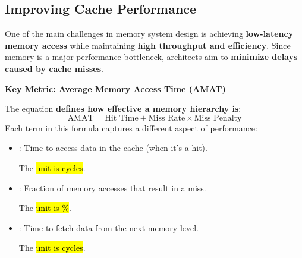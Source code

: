 \subsection{Improving Cache Performance}

One of the main challenges in memory system design is achieving \textbf{low-latency memory access} while maintaining \textbf{high throughput and efficiency}. Since memory is a major performance bottleneck, architects aim to \textbf{minimize delays caused by cache misses}.

\highspace
\begin{flushleft}
    \textcolor{Green3}{ \textbf{Key Metric: Average Memory Access Time (AMAT)}}
\end{flushleft}
The  equation \textbf{defines how effective a memory hierarchy is}:
\begin{equation}
    \text{AMAT} = \text{Hit Time} + \text{Miss Rate} \times \text{Miss Penalty}
\end{equation}
Each term in this formula captures a different aspect of performance:
\begin{itemize}
    \item {}: Time to access data in the cache (when it's a hit).
    
    The \hl{unit is cycles}.
    \item {}: Fraction of memory accesses that result in a miss.
    
    The \hl{unit is \%}.
    \item {}: Time to fetch data from the next memory level.
    
    The \hl{unit is cycles}.
\end{itemize}

